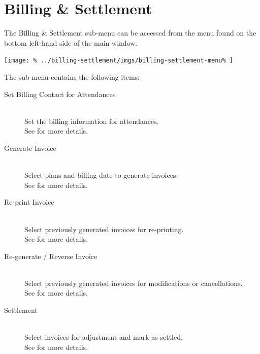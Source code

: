 \documentclass[../main/main]{subfiles}
\begin{document}
\newpage
\chapter{Billing \& Settlement}
The Billing \& Settlement sub-menu can be accessed from the menu found
on the bottom left-hand side of the main window.

\texttt{[image: \%
  ../billing-settlement/imgs/billing-settlement-menu\%
]}

The sub-menu contains the following items:-
\begin{description}
\item[Set Billing Contact for Attendances] \hfill \\
Set the billing information for attendances.\\
See  for more details.\\
\item[Generate Invoice] \hfill \\
Select plans and billing date to generate invoices.\\
See  for more details.
\item[Re-print Invoice] \hfill \\
Select previously generated invoices for re-printing.\\
See  for more details.
\item[Re-generate / Reverse Invoice] \hfill \\
Select previously generated invoices for modifications or cancellations.\\
See  for more details.
\item[Settlement] \hfill \\
Select invoices for adjustment and mark as settled.\\
See  for more details.
\end{description}






\end{document}

